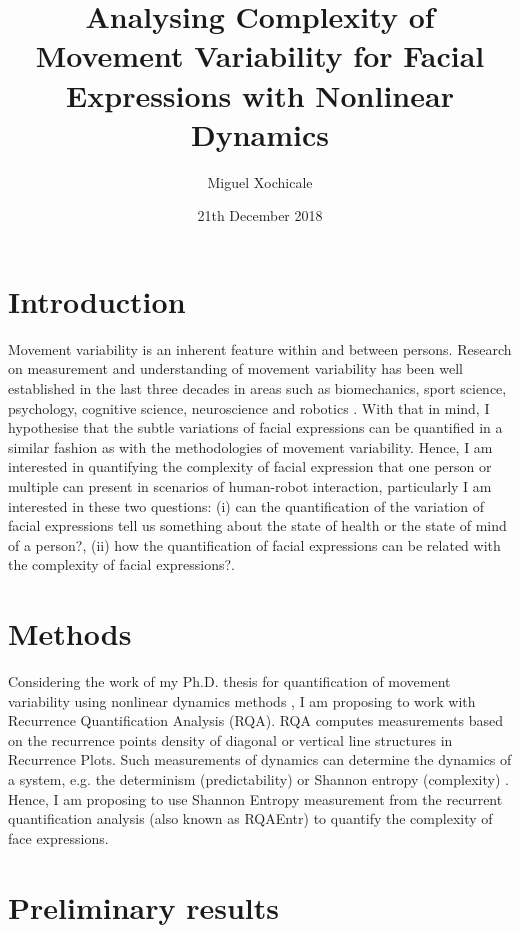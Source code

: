 \documentclass[12pt]{article}
\title{Analysing Complexity of Movement Variability 
for Facial Expressions with Nonlinear Dynamics}
\author{Miguel Xochicale\\ 
}
\date{21th December 2018}
\begin{document}
\maketitle


%


\section{Introduction}
Movement variability is an inherent feature within and between persons. 
Research on measurement and understanding of movement variability has been 
well established in the last three decades in areas such as biomechanics, 
sport science, psychology, cognitive science, neuroscience and robotics 
\cite{2018arXiv181009249X}.
With that in mind, I hypothesise that the subtle variations of facial 
expressions can be quantified in a similar fashion as with the methodologies 
of movement variability. Hence, I am interested in quantifying the complexity 
of facial expression that one person or multiple can present in scenarios 
of human-robot interaction, particularly I am interested in these two questions: 
(i) can the quantification of the variation of facial expressions tell us 
something about the state of health or the state of mind of a person?, 
(ii) how the quantification of facial expressions can be related with 
the complexity of facial expressions?.


\section{Methods}
Considering the work of my Ph.D. thesis for quantification of movement variability 
using nonlinear dynamics methods \cite{XochicalePhDThesis2018},
I am proposing to work with Recurrence Quantification Analysis (RQA). 
RQA computes measurements based on the recurrence points density of diagonal 
or vertical line structures in Recurrence Plots. 
Such measurements of dynamics can determine the dynamics of a system,
e.g. the determinism (predictability) or Shannon entropy (complexity) 
\cite{marwan2007}. 
Hence, I am proposing to use Shannon Entropy measurement 
from the recurrent quantification analysis (also known as RQAEntr)
to quantify the complexity of face expressions. 


\section{Preliminary results}
\end{document}
